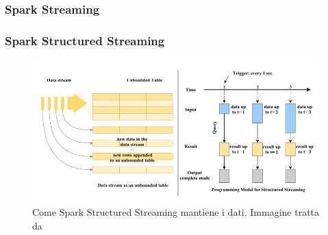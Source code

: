 \documentclass[12pt,italian]{article}
\begin{document}
\subsubsection{Spark Streaming}
\subsubsection{Spark Structured Streaming}
\begin{figure}[H]
	\centering 
	\includegraphics[width=0.8\linewidth]{img/sparkStructuredStreaming.png}
	\caption{Come Spark Structured Streaming mantiene i dati. Immagine tratta da \cite{structuredStreaming}}
	\label{fig:StructuredStreaming}
\end{figure}
\newpage
\printbibliography
\end{document}
